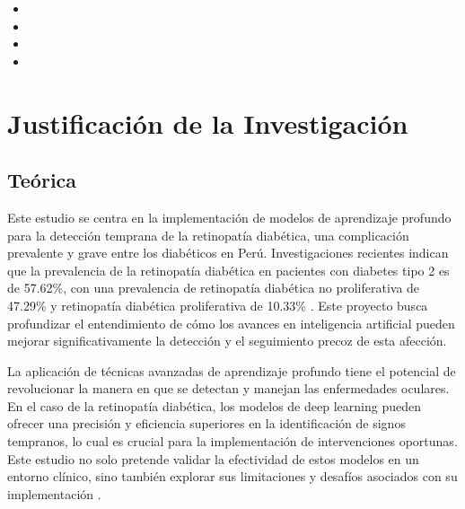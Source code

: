 \begin{itemize}
	\item \Objone
	\item \Objtwo
	\item \Objthree
	 \item \Objfour
\end{itemize}

\section{Justificación de la Investigación}

\subsection{Teórica}

Este estudio se centra en la implementación de modelos de aprendizaje profundo para la detección temprana de la retinopatía diabética, una complicación prevalente y grave entre los diabéticos en Perú. Investigaciones recientes indican que la prevalencia de la retinopatía diabética en pacientes con diabetes tipo 2 es de 57.62\%, con una prevalencia de retinopatía diabética no proliferativa de 47.29\% y retinopatía diabética proliferativa de 10.33\% \cite{yanhez2016prevalencia}. Este proyecto busca profundizar el entendimiento de cómo los avances en inteligencia artificial pueden mejorar significativamente la detección y el seguimiento precoz de esta afección. 

La aplicación de técnicas avanzadas de aprendizaje profundo tiene el potencial de revolucionar la manera en que se detectan y manejan las enfermedades oculares. En el caso de la retinopatía diabética, los modelos de deep learning pueden ofrecer una precisión y eficiencia superiores en la identificación de signos tempranos, lo cual es crucial para la implementación de intervenciones oportunas. Este estudio no solo pretende validar la efectividad de estos modelos en un entorno clínico, sino también explorar sus limitaciones y desafíos asociados con su implementación \cite{huang2023advances}.


